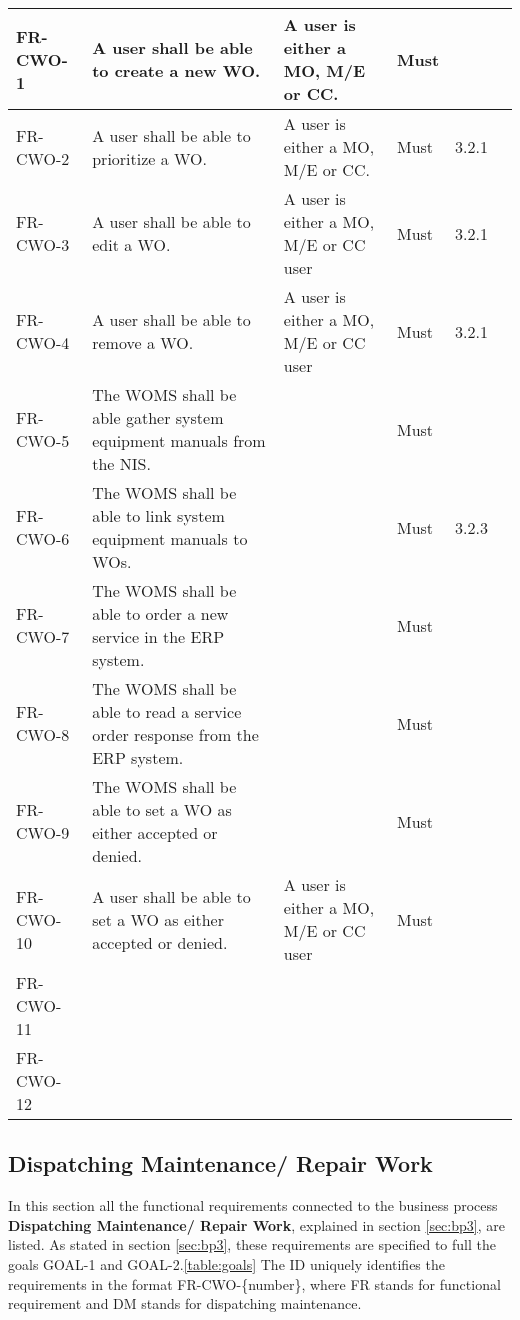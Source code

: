 \begin{center}
\begin{longtable}{|l|p{4cm}|p{4cm}|l|l|l|}
FR-CWO-1 & A user shall be able to create a new  WO.& A user is either a MO, M/E or CC. & Must & \\
\hline
FR-CWO-2 & A user shall be able to prioritize a WO. & A user is either a MO, M/E or CC.& Must & 3.2.1\\
\hline
FR-CWO-3 & A user shall be able to edit a WO.  & A user is either a MO, M/E or CC user & Must & 3.2.1 \\
\hline
FR-CWO-4 & A user shall be able to remove a WO. & A user is either a MO, M/E or CC user & Must & 3.2.1 \\
\hline
FR-CWO-5 & The WOMS shall be able gather system equipment manuals from the NIS. & & Must & \\
\hline
FR-CWO-6 & The WOMS shall be able to link system equipment manuals to WOs. & & Must & 3.2.3 \\
\hline
FR-CWO-7 & The WOMS shall be able to order a new service in the ERP system. & & Must & \\
\hline
FR-CWO-8 & The WOMS shall be able to read a service order response from the ERP system. & & Must & \\
\hline
FR-CWO-9 & The WOMS shall be able to set a WO as either accepted or denied. & & Must & \\
\hline
FR-CWO-10& A user shall be able to set a WO as either accepted or denied. &A user is either a MO, M/E or CC user & Must & \\
\hline
FR-CWO-11& & & & \\
\hline
FR-CWO-12& & & & \\
\end{longtable}
\end{center}

\subsection{Dispatching Maintenance/ Repair Work}
\label{sub:dispatching_maintenance}	
In this section all the functional requirements connected to the business process \textbf{Dispatching Maintenance/ Repair Work}, explained in section \ref{sec:bp3}, are listed. As stated in section \ref{sec:bp3}, these requirements are specified to full the goals GOAL-1 and GOAL-2.\ref{table:goals} The ID uniquely identifies the requirements in the format FR-CWO-\{number\}, where  FR stands for functional requirement and DM stands for dispatching maintenance. 


